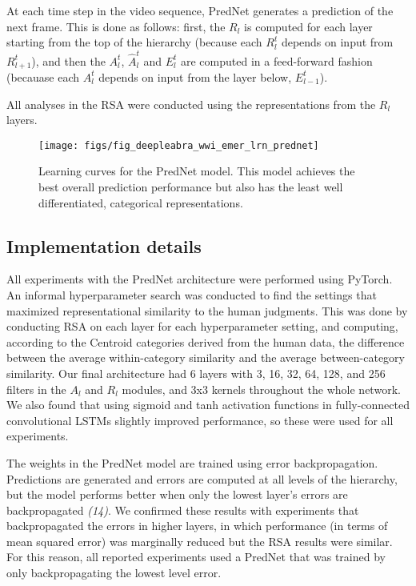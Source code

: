 \documentclass[12pt,twoside]{article}
\newif\myifpdf
\begin{document}
At each time step in the video sequence, PredNet generates a prediction of the next frame. This is done as follows: first, the $R_l$ is computed for each layer starting from the top of the hierarchy (because each $R_l^t$ depends on input from $R_{l+1}^t$), and then the $A_l^t$, $\hat{A}_l^{t}$ and $E_l^t$ are computed in a feed-forward fashion (becauase each $A_l^t$ depends on input from the layer below, $E_{l-1}^t$). 


All analyses in the RSA were conducted using the representations from the $R_l$ layers. 

\begin{figure}
  \centering\texttt{[image: figs/fig\_deepleabra\_wwi\_emer\_lrn\_prednet]}
  \caption{Learning curves for the PredNet model.  This model achieves the best overall prediction performance but also has the least well differentiated, categorical representations.}
  \label{fig.prednet_lrn}
\end{figure}

\subsection{Implementation details}

All experiments with the PredNet architecture were performed using PyTorch. An informal hyperparameter search was conducted to find the settings that maximized representational similarity to the human judgments. This was done by conducting RSA on each layer for each hyperparameter setting, and computing, according to the Centroid categories derived from the human data, the difference between the average within-category similarity and the average between-category similarity. Our final architecture had 6 layers with 3, 16, 32, 64, 128, and 256 filters in the $A_l$ and $R_l$ modules, and 3x3 kernels throughout the whole network. We also found that using sigmoid and tanh activation functions in fully-connected convolutional LSTMs slightly improved performance, so these were used for all experiments.

The weights in the PredNet model are trained using error backpropagation. Predictions are generated and errors are computed at all levels of the hierarchy, but the model performs better when only the lowest layer's errors are backpropagated %
{\em (14)}. We confirmed these results with experiments that backpropagated the errors in higher layers, in which performance (in terms of mean squared error) was marginally reduced but the RSA results were similar. For this reason, all reported experiments used a PredNet that was trained by only backpropagating the lowest level error.
\end{document}
